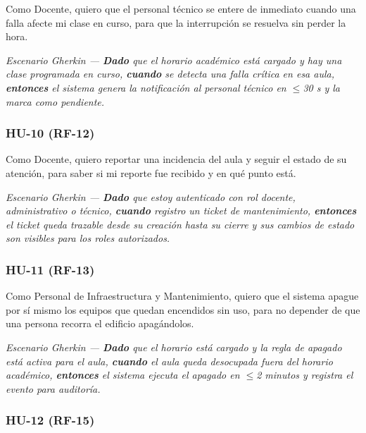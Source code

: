 
Como Docente, quiero que el personal técnico se entere de inmediato cuando una falla afecte mi clase en curso, para que la interrupción se resuelva sin perder la hora.

\textit{Escenario Gherkin --- \textbf{Dado} que el horario académico está cargado y hay una clase programada en curso, \textbf{cuando} se detecta una falla crítica en esa aula, \textbf{entonces} el sistema genera la notificación al personal técnico en $\leq$30 s y la marca como pendiente.}

\subsubsection*{HU-10 (RF-12)}


Como Docente, quiero reportar una incidencia del aula y seguir el estado de su atención, para saber si mi reporte fue recibido y en qué punto está.

\textit{Escenario Gherkin --- \textbf{Dado} que estoy autenticado con rol docente, administrativo o técnico, \textbf{cuando} registro un ticket de mantenimiento, \textbf{entonces} el ticket queda trazable desde su creación hasta su cierre y sus cambios de estado son visibles para los roles autorizados.}

\subsubsection*{HU-11 (RF-13)}


Como Personal de Infraestructura y Mantenimiento, quiero que el sistema apague por sí mismo los equipos que quedan encendidos sin uso, para no depender de que una persona recorra el edificio apagándolos.

\textit{Escenario Gherkin --- \textbf{Dado} que el horario está cargado y la regla de apagado está activa para el aula, \textbf{cuando} el aula queda desocupada fuera del horario académico, \textbf{entonces} el sistema ejecuta el apagado en $\leq$2 minutos y registra el evento para auditoría.}

\subsubsection*{HU-12 (RF-15)}

